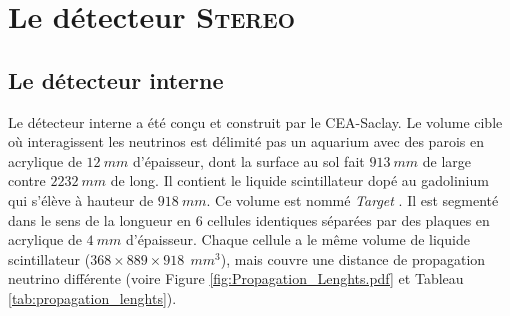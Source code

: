 \bigbreak 

\section{Le détecteur \textsc{Stereo}} 

\subsection{Le détecteur interne} 

Le détecteur interne a été conçu et construit par le CEA-Saclay. Le volume cible où interagissent les neutrinos est délimité pas un aquarium avec des parois en acrylique de $\SI{12}{mm}$ d'épaisseur, dont la surface au sol fait $\SI{913}{mm}$ de large contre $\SI{2232}{mm}$ de long. Il contient le liquide scintillateur dopé au gadolinium qui s'élève à hauteur de $\SI{918}{mm}$. Ce volume est nommé \og \textit{Target} \fg{}. Il est segmenté dans le sens de la longueur en 6 cellules identiques séparées par des plaques en acrylique de $\SI{4}{mm}$ d'épaisseur. Chaque cellule a le même volume de liquide scintillateur ($368 \times 889 \times 918 \ \SI{}{mm^3}$), mais couvre une distance de propagation neutrino différente (voire Figure \ref{fig:Propagation_Lenghts.pdf} et Tableau \ref{tab:propagation_lenghts}).\\ 

